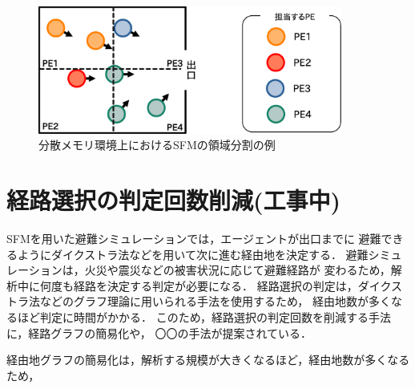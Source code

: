 \begin{figure}[t]
 \begin{center}
  \includegraphics[width=10cm,clip]{figure/ryoiki_heiretu.eps}
  \caption{分散メモリ環境上におけるSFMの領域分割の例}
  \label{fig:ryouiki_heiretu}
 \end{center}
\end{figure}

\clearpage
\section{経路選択の判定回数削減(工事中)}
SFMを用いた避難シミュレーションでは，エージェントが出口までに
避難できるようにダイクストラ法などを用いて次に進む経由地を決定する．
避難シミュレーションは，火災や震災などの被害状況に応じて避難経路が
変わるため，解析中に何度も経路を決定する判定が必要になる．
経路選択の判定は，ダイクストラ法などのグラフ理論に用いられる手法を使用するため，
経由地数が多くなるほど判定に時間がかかる．
このため，経路選択の判定回数を削減する手法に，経路グラフの簡易化や，
〇〇の手法が提案されている．

経由地グラフの簡易化は，解析する規模が大きくなるほど，経由地数が多くなるため，
\fi 

